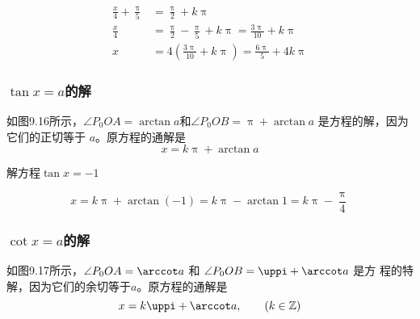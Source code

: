 \begin{solution}
    \[\begin{split}
        \frac{x}{4}+\frac{\uppi}{5}&=\frac{\uppi}{2}+k\uppi\\
        \frac{x}{4}&=\frac{\uppi}{2}-\frac{\uppi}{5}+k\uppi=\frac{3\uppi}{10}+k\uppi\\
        x&=4\left(\frac{3\uppi}{10}+k\uppi\right)=\frac{6\uppi}{5}+4k\uppi
    \end{split}
    \]
\end{solution}

\subsubsection{$\tan x=a$的解}

如图9.16所示，$\angle P_0OA=\arctan a$和$\angle P_0OB=\uppi+\arctan a$
是方程的解，因为它们的正切等于 $a$。原方程的通解是
\[x=k\uppi+\arctan a\]


\begin{example}
    解方程$\tan x=-1$    
\end{example}

\begin{solution}
\[x=k\uppi+\arctan(-1)=k\uppi-\arctan1=k\uppi-\frac{\uppi}{4}\]
\end{solution}

\subsubsection{$\cot x=a$的解}

如图9.17所示，$\angle P_0OA=\arccot a$ 和 $\angle P_0OB=\uppi+\arccot a$ 是方
程的特解，因为它们的余切等于$a$。原方程的通解是
\[x=k\uppi+\arccot a,\qquad (k\in\mathbb{Z})\]

